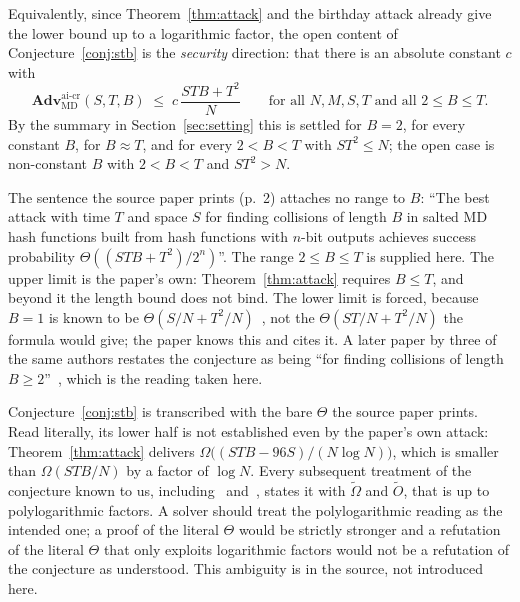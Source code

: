 \documentclass{aicr-conjecture}
\newcommand{\MD}{\mathrm{MD}}
\newcommand{\Adv}{\mathbf{Adv}}
\newcommand{\aicr}{\mathrm{ai\text{-}cr}}
\newcommand{\tO}{\tilde{O}}
\newcommand{\tOm}{\tilde{\Omega}}
\begin{document}
Equivalently, since Theorem~\ref{thm:attack} and the birthday attack
already give the lower bound up to a logarithmic factor, the open
content of Conjecture~\ref{conj:stb} is the \emph{security} direction:
that there is an absolute constant $c$ with
\[
  \Adv^{\aicr}_{\MD}(S,T,B) \;\le\; c\,\frac{STB + T^{2}}{N}
  \qquad \text{for all } N, M, S, T \text{ and all } 2 \le B \le T.
\]
By the summary in Section~\ref{sec:setting} this is settled for
$B = 2$, for every constant $B$, for $B \approx T$, and for every
$2 < B < T$ with $ST^{2} \le N$; the open case is non-constant $B$
with $2 < B < T$ and $ST^{2} > N$.

\begin{remark}\label{rem:range}
The sentence the source paper prints (p.~2) attaches no range to $B$:
``The best attack with time $T$ and space $S$ for finding collisions of
length $B$ in salted MD hash functions built from hash functions with
$n$-bit outputs achieves success probability $\Theta((STB + T^{2})
/2^{n})$''. The range $2 \le B \le T$ is supplied here. The upper
limit is the paper's own: Theorem~\ref{thm:attack} requires $B \le T$,
and beyond it the length bound does not bind. The lower limit is
forced, because $B = 1$ is known to be $\Theta(S/N +
T^{2}/N)$~\cite{DGK17}, not the $\Theta(ST/N + T^{2}/N)$ the formula
would give; the paper knows this and cites it. A later paper by three
of the same authors restates the conjecture as being ``for finding
collisions of length $B \ge 2$''~\cite{ADGL23}, which is the reading
taken here.
\end{remark}

\begin{remark}\label{rem:logs}
Conjecture~\ref{conj:stb} is transcribed with the bare $\Theta$ the
source paper prints. Read literally, its lower half is not established
even by the paper's own attack: Theorem~\ref{thm:attack} delivers
$\Omega\bigl((STB - 96S)/(N\log N)\bigr)$, which is smaller than
$\Omega(STB/N)$ by a factor of $\log N$. Every subsequent treatment
of the conjecture known to us, including~\cite{AGL22} and~\cite{GK22},
states it with $\tOm$ and $\tO$, that is up to polylogarithmic
factors. A solver should treat the polylogarithmic reading as the
intended one; a proof of the literal $\Theta$ would be strictly
stronger and a refutation of the literal $\Theta$ that only exploits
logarithmic factors would not be a refutation of the conjecture as
understood. This ambiguity is in the source, not introduced here.
\end{remark}
\end{document}
